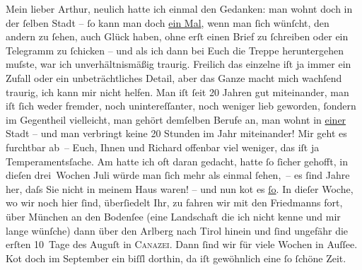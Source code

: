 \pstart{}Mein lieber Arthur, \pend\vspace{0.5em}
\pstart
           neulich hatte ich einmal den Gedanken: man wohnt doch in der ſelben Stadt – ſo kann
               man doch \uline{ein Mal}, wenn man ſich wünſcht, den andern
               zu ſehen, auch Glück haben, ohne erſt einen Brief zu ſchreiben oder ein Telegramm zu
               ſchicken – und als ich dann bei Euch die Treppe heruntergehen {\pb}muſste, war ich unverhältnismäßig
               traurig. Freilich das einzelne iſt ja immer ein Zufall oder ein unbeträchtliches
               Detail, aber das Ganze macht mich wachſend traurig, ich kann mir nicht helfen. Man
               iſt ſeit 20 Jahren gut miteinander, man iſt ſich weder fremder, noch unintereſſanter,
               noch weniger lieb geworden, {\pb}ſondern im Gegentheil vielleicht, man gehört demſelben Berufe an, man wohnt in \uline{einer} Stadt – und man verbringt keine 20 Stunden im
               Jahr miteinander! Mir geht es furchtbar ab – Euch, Ihnen und Richard offenbar viel weniger, das iſt ja Temperamentsſache. Am
                  \label{K_L01947-1v}\label{K_L01947-1}{ }{\pb}hatte ich oft daran gedacht,
               hatte ſo ſicher gehofft, in dieſen drei Wochen Juli würde man ſich mehr
               als einmal ſehen, – es ſind Jahre her, daſs Sie nicht in meinem Haus waren! – und nun ko{\geminationm}t es \uline{ſo}. In dieſer
               Woche, wo wir noch hier ſind,  überſiedelt Ihr,
               zu \label{K_L01947-2v}\label{K_L01947-2} fahren wir mit {\pb}den
                  Friedmanns fort, über München an den Bodenſee (eine Landschaft die ich nicht kenne und mir lange wünſche) dann
               über den Arlberg nach Tirol hinein und ſind ungefähr die erſten 10 Tage des
                  Auguſt in \textsc{Canazei}. Dann ſind wir für viele Wochen {\pb}in Auſſee. Ko{\geminationm}t doch im September ein
               biſſl dorthin, da iſt gewöhnlich eine ſo ſchöne Zeit.\pend
           
